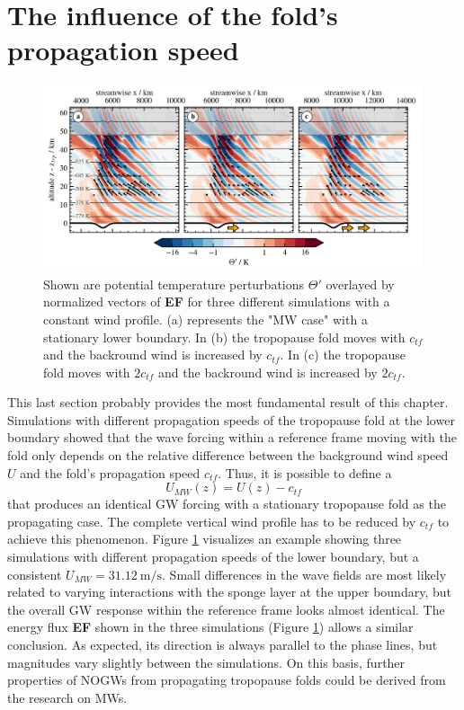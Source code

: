 \section{The influence of the fold's propagation speed}
\begin{figure}[tbp]
    \centering
    \includegraphics[width=0.99\textwidth]{figures_q3D/Q3D-TH-EF-ctropo.png}
    \caption{Shown are potential temperature perturbations $\Theta'$ overlayed by normalized vectors of \textbf{EF} for three different simulations with a constant wind profile. (a) represents the "MW case" with a stationary lower boundary. In (b) the tropopause fold moves with $c_{tf}$ and the backround wind is increased by $c_{tf}$. In (c) the tropopause fold moves with $2c_{tf}$ and the backround wind is increased by $2c_{tf}$.}
    \label{fig:q3D_ctropo}
\end{figure}
This last section probably provides the most fundamental result of this chapter. Simulations with different propagation speeds of the tropopause fold at the lower boundary showed that the wave forcing within a reference frame moving with the fold only depends on the relative difference between the background wind speed $U$ and the fold's propagation speed $c_{tf}$. Thus, it is possible to define a 
\begin{equation}
    U_{MW}(z) = U(z)-c_{tf}
\end{equation}
that produces an identical GW forcing with a stationary tropopause fold as the propagating case. The complete vertical wind profile has to be reduced by $c_{tf}$ to achieve this phenomenon. Figure \ref{fig:q3D_ctropo} visualizes an example showing three simulations with different propagation speeds of the lower boundary, but a consistent $U_{MW}=\SI{31.12}{\meter\per\second}$. Small differences in the wave fields are most likely related to varying interactions with the sponge layer at the upper boundary, but the overall GW response within the reference frame looks almost identical. The energy flux \textbf{EF} shown in the three simulations (Figure \ref{fig:q3D_ctropo}) allows a similar conclusion. As expected, its direction is always parallel to the phase lines, but magnitudes vary slightly between the simulations. On this basis, further properties of NOGWs from propagating tropopause folds could be derived from the research on MWs.


